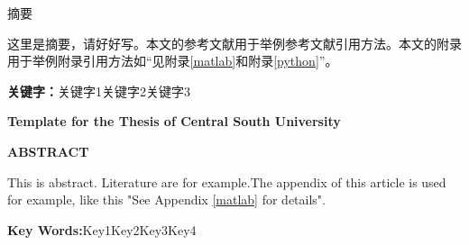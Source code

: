 \vspace*{-21.6pt}
\begin{center}
\heiti
\end{center}
\par
\begin{center}
	\heiti
	摘要
\end{center}

这里是摘要，请好好写。本文的参考文献用于举例参考文献引用方法\cite{IOTB2}。本文的附录用于举例附录引用方法如“见附录\ref{matlab}和附录\ref{python}”。
\par

\bigskip
\noindent\textbf{关键字：}关键字1\quad 关键字2\quad 关键字3

\newpage
\vspace*{-21.6pt}
\begin{center}
\bfseries
\rmfamily Template for the Thesis of Central South University
\end{center}
\par
{}
{}
\begin{center}
\rmfamily\bfseries
ABSTRACT
\end{center}

\par
This is abstract. Literature are for example\cite{IOTB2}.The appendix of this article is used for example, like this "See Appendix \ref{matlab} for details".

\bigskip
\noindent\textbf{Key Words:}\quad Key1\quad Key2\quad Key3\quad Key4
